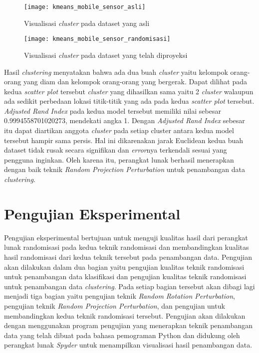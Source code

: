 \begin{figure}
	\centering
	\texttt{[image: kmeans\_mobile\_sensor\_asli]}
	\caption{Visualisasi \textit{cluster} pada dataset yang asli}
	\label{fig:kmeans_mobile_sensor_asli}
\end{figure}

\begin{figure}
	\centering
	\texttt{[image: kmeans\_mobile\_sensor\_randomisasi]}
	\caption{Visualisasi \textit{cluster} pada dataset yang telah diproyeksi}
	\label{fig:kmeans_mobile_sensor_randomisasi}
\end{figure}

Hasil \textit{clustering} menyatakan bahwa ada dua buah \textit{cluster} yaitu kelompok orang-orang yang diam dan kelompok orang-orang yang bergerak. Dapat dilihat pada kedua \textit{scatter plot} tersebut \textit{cluster} yang dihasilkan sama yaitu 2 \textit{cluster} walaupun ada sedikit perbedaan lokasi titik-titik yang ada pada kedua \textit{scatter plot} tersebut. \textit{Adjusted Rand Index} pada kedua model tersebut memiliki nilai sebesar 0.9994558701020273, mendekati angka 1. Dengan \textit{Adjusted Rand Index} sebesar itu dapat diartikan anggota \textit{cluster} pada setiap cluster antara kedua model tersebut hampir sama persis. Hal ini dikarenakan jarak Euclidean kedua buah dataset tidak rusak secara signifikan dan \textit{error}nya terkendali sesuai yang pengguna inginkan. Oleh karena itu, perangkat lunak berhasil menerapkan dengan baik teknik \textit{Random Projection Perturbation} untuk penambangan data \textit{clustering}.

\section{Pengujian Eksperimental}
\label{sec:pengujianeksperimental}

Pengujian eksperimental bertujuan untuk menguji kualitas hasil dari perangkat lunak randomisasi pada kedua teknik randomisasi dan membandingkan kualitas hasil randomisasi dari kedua teknik tersebut pada penambangan data. Pengujian akan dilakukan dalam dua bagian yaitu pengujian kualitas teknik randomisasi untuk penambangan data klasifikasi dan pengujian kualitas teknik randomisasi untuk penambangan data \textit{clustering}. Pada setiap bagian tersebut akan dibagi lagi menjadi tiga bagian yaitu pengujian teknik \textit{Random Rotation Perturbation}, pengujian teknik \textit{Random Projection Perturbation}, dan pengujian untuk membandingkan kedua teknik randomisasi tersebut. Pengujian akan dilakukan dengan menggunakan program pengujian yang menerapkan teknik penambangan data yang telah dibuat pada bahasa pemograman Python dan didukung oleh perangkat lunak \textit{Spyder} untuk menampilkan visualisasi hasil penambangan data.

